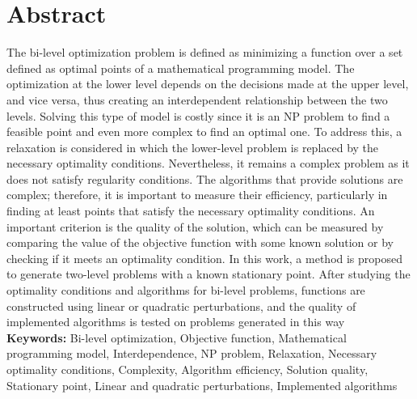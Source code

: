 \chapter*{Abstract}
The bi-level optimization problem is defined as minimizing a function over a set defined as optimal points of a mathematical programming model. The optimization at the lower level depends on the decisions made at the upper level, and vice versa, thus creating an interdependent relationship between the two levels.
Solving this type of model is costly since it is an NP problem to find a feasible point and even more complex to find an optimal one. To address this, a relaxation is considered in which the lower-level problem is replaced by the necessary optimality conditions. Nevertheless, it remains a complex problem as it does not satisfy regularity conditions. The algorithms that provide solutions are complex; therefore, it is important to measure their efficiency, particularly in finding at least points that satisfy the necessary optimality conditions. An important criterion is the quality of the solution, which can be measured by comparing the value of the objective function with some known solution or by checking if it meets an optimality condition.
In this work, a method is proposed to generate two-level problems with a known stationary point. After studying the optimality conditions and algorithms for bi-level problems, functions are constructed using linear or quadratic perturbations, and the quality of implemented algorithms is tested on problems generated in this 
way\\
\textbf{Keywords:} Bi-level optimization, Objective function, Mathematical programming model, Interdependence, NP problem, Relaxation, Necessary optimality conditions, Complexity, Algorithm efficiency, Solution quality, Stationary point, Linear and quadratic perturbations, Implemented algorithms
